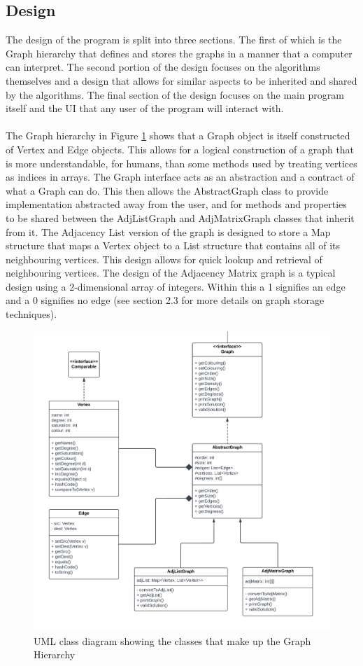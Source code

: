 \subsection{Design}
The design of the program is split into three sections. The first of which is the Graph hierarchy that defines and stores the graphs in a manner that a computer can interpret. The second portion of the design focuses on the algorithms themselves and a design that allows for similar aspects to be inherited and shared by the algorithms. The final section of the design focuses on the main program itself and the UI that any user of the program will interact with. 
\\\\
The Graph hierarchy in Figure \ref{fig:GraphHierarchy} shows that a Graph object is itself constructed of Vertex and Edge objects. This allows for a logical construction of a graph that is more understandable, for humans, than some methods used by treating vertices as indices in arrays. The Graph interface acts as an abstraction and a contract of what a Graph can do. This then allows the AbstractGraph class to provide implementation abstracted away from the user, and for methods and properties to be shared between the AdjListGraph and AdjMatrixGraph classes that inherit from it. The Adjacency List version of the graph is designed to store a Map structure that maps a Vertex object to a List structure that contains all of its neighbouring vertices. This design allows for quick lookup and retrieval of neighbouring vertices. The design of the Adjacency Matrix graph is a typical design using a  2-dimensional array of integers. Within this a 1 signifies an edge and a 0 signifies no edge (see section 2.3 for more details on graph storage techniques). 
\begin{figure}[H]
    \centering
    \includegraphics[width=0.9\linewidth]{Components/GraphHierarchy.png}
    \caption{UML class diagram showing the classes that make up the Graph Hierarchy}
    \label{fig:GraphHierarchy}
\end{figure}

